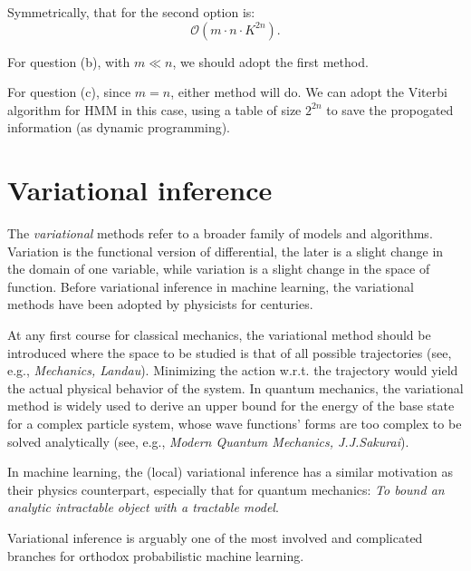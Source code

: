 \documentclass[UTF8]{ctexart}
\begin{document}
Symmetrically, that for the second option is:
$$\mathcal{O}(m\cdot n\cdot K^{2n}).$$

For question (b), with $m \ll n$, we should adopt the first method. 

For question (c), since $m=n$, either method will do.
We can adopt the Viterbi algorithm for HMM in this case, using a table of size $2^{2n}$ to save the propogated information (as dynamic programming). 

\newpage
\section{Variational inference}
The \emph{variational} methods refer to a broader family of models and algorithms. 
Variation is the functional version of differential, the later is a slight change in the domain of one variable, while variation is a slight change in the space of function.
Before variational inference in machine learning, the variational methods have been adopted by physicists for centuries. 

At any first course for classical mechanics, the variational method should be introduced where the space to be studied is that of all possible trajectories (see, e.g., \emph{Mechanics, Landau}). 
Minimizing the action w.r.t. the trajectory would yield the actual physical behavior of the system. 
In quantum mechanics, the variational method is widely used to derive an upper bound for the energy of the base state for a complex particle system, whose wave functions' forms are too complex to be solved analytically (see, e.g., \emph{Modern Quantum Mechanics, J.J.Sakurai}). 

In machine learning, the (local) variational inference has a similar motivation as their physics counterpart, especially that for quantum mechanics: \emph{To bound an analytic intractable object with a tractable model}. 

Variational inference is arguably one of the most involved and complicated branches for orthodox probabilistic machine learning. 
\end{document}
